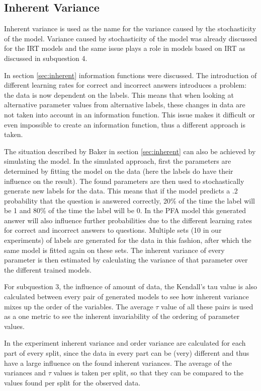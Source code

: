 \documentclass{scrartcl}
\begin{document}
\subsection{Inherent Variance}
Inherent variance is used as the name for the variance caused by the stochasticity of the model. Variance caused by stochasticity of the model was already discussed for the IRT models and the same issue plays a role in models based on IRT as discussed in subquestion 4.

In section \ref{sec:inherent} information functions were discussed. The introduction of different learning rates for correct and incorrect answers introduces a problem: the data is now dependent on the labels. This means that when looking at alternative parameter values from alternative labels, these changes in data are not taken into account in an information function. This issue makes it difficult or even impossible to create an information function, thus a different approach is taken.

The situation described by Baker in section \ref{sec:inherent} can also be achieved by simulating the model. In the simulated approach, first the parameters are determined by fitting the model on the data (here the labels do have their influence on the result). The found parameters are then used to stochastically generate new labels for the data. This means that if the model predicts a .2 probability that the question is answered correctly, 20\% of the time the label will be 1 and 80\% of the time the label will be 0. In the PFA model this generated answer will also influence further probabilities due to the different learning rates for correct and incorrect answers to questions. Multiple sets (10 in our experiments) of labels are generated for the data in this fashion, after which the same model is fitted again on these sets. The inherent variance of every parameter is then estimated by calculating the variance of that parameter over the different trained models.

For subquestion 3, the influence of amount of data, the Kendall's tau value is also calculated between every pair of generated models to see how inherent variance mixes up the order of the variables. The average $\tau$ value of all these pairs is used as a one metric to see the inherent invariability of the ordering of parameter values. 

In the experiment inherent variance and order variance are calculated for each part of every split, since the data in every part can be (very) different and thus have a large influence on the found inherent variances. The average of the variances and $\tau$ values is taken per split, so that they can be compared to the values found per split for the observed data. 
\end{document}
